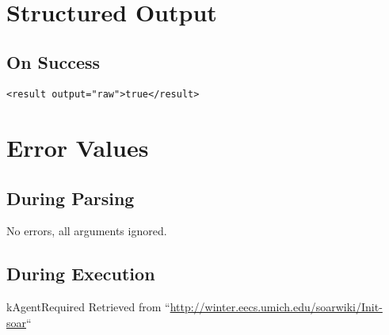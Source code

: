 \documentclass[10pt]{article}
\begin{document}
 \\ 

\section*{ Structured Output }
\subsection*{ On Success }
\begin{verbatim}
<result output="raw">true</result>

\end{verbatim}
\section*{ Error Values }
\subsection*{ During Parsing }


 No errors, all arguments ignored. 
\subsection*{ During Execution }


 kAgentRequired Retrieved from ``\url{http://winter.eecs.umich.edu/soarwiki/Init-soar}``
\end{document}
